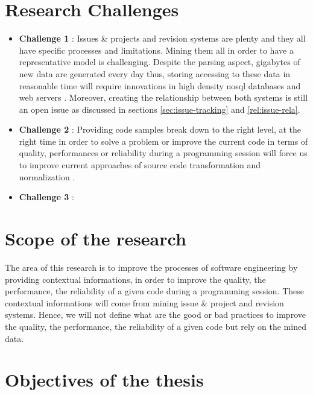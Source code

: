 \section{Research Challenges\label{sec:challenges}}

\begin{itemize}
	\item {\bf Challenge 1} : Issues \& projects and revision systems are plenty and they all have specific processes and limitations. Mining them all in order to have a representative model is challenging. Despite the parsing aspect, gigabytes of new data are generated every day thus, storing accessing to these data in reasonable time will require innovations in high density nosql databases \cite{Nayrolles2014b} and web servers \cite{Nayrolles2013b,Nayrolles2014c}. Moreover, creating the relationship between both systems is still an open issue as discussed in sections \ref{sec:issue-tracking} and \ref{rel:issue-rela}.

	\item {\bf Challenge 2} : Providing code samples break down to the right level, at the right time in order to solve a problem  or improve the current code in terms of quality, performances or reliability during a programming session will force us to improve current approaches of source code transformation and normalization \cite{Cordy2006a, Cordy2006,Roy2008,Cordy2011}.
	\item {\bf Challenge 3} : 
\end{itemize}

\section{Scope of the research \label{sec:scope}}

The area of this research is to improve the processes of software engineering by providing contextual informations, in order to improve the quality, the performance, the reliability of a given code during a programming session. These contextual informations will come from mining issue \& project and revision systems. Hence, we will not define what are the good or bad practices to improve the quality, the performance, the reliability of a given code but rely on the mined data.

\section{Objectives of the thesis\label{sec:objective-thesis}}

